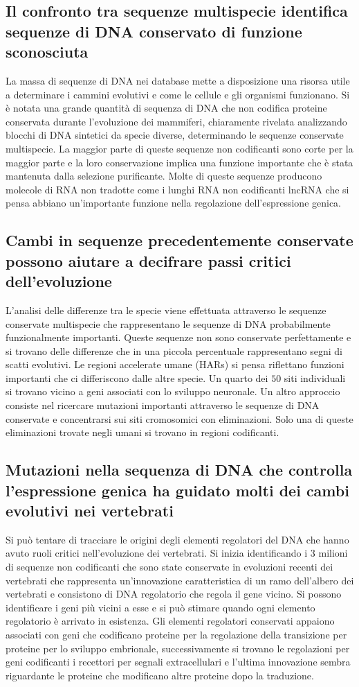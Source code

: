 \subsection{Il confronto tra sequenze multispecie identifica sequenze di DNA conservato di funzione sconosciuta}
La massa di sequenze di DNA nei database mette a disposizione una risorsa utile a determinare i cammini evolutivi e come le cellule e gli organismi funzionano. Si \`e notata una grande
quantit\`a di sequenza di DNA che non codifica proteine conservata durante l'evoluzione dei mammiferi, chiaramente rivelata analizzando blocchi di DNA sintetici da specie diverse, 
determinando le sequenze conservate multispecie. La maggior parte di queste sequenze non codificanti sono corte per la maggior parte e la loro conservazione implica una funzione 
importante che \`e stata mantenuta dalla selezione purificante. Molte di queste sequenze producono molecole di RNA non tradotte come i lunghi RNA non codificanti lncRNA che si pensa
abbiano un'importante funzione nella regolazione dell'espressione genica. 
\subsection{Cambi in sequenze precedentemente conservate possono aiutare a decifrare passi critici dell'evoluzione}
L'analisi delle differenze tra le specie viene effettuata attraverso le sequenze conservate multispecie che rappresentano le sequenze di DNA probabilmente funzionalmente importanti. 
Queste sequenze non sono conservate perfettamente e si trovano delle differenze che in una piccola percentuale rappresentano segni di scatti evolutivi. Le regioni accelerate umane
(HARs) si pensa riflettano funzioni importanti che ci differiscono dalle altre specie. Un quarto dei $50$ siti individuali si trovano vicino a geni associati con lo sviluppo neuronale. 
Un altro approccio consiste nel ricercare mutazioni importanti attraverso le sequenze di DNA conservate e concentrarsi sui siti cromosomici con eliminazioni. Solo una di queste 
eliminazioni trovate negli umani si trovano in regioni codificanti. 
\subsection{Mutazioni nella sequenza di DNA che controlla l'espressione genica ha guidato molti dei cambi evolutivi nei vertebrati}
Si pu\`o tentare di tracciare le origini degli elementi regolatori del DNA che hanno avuto ruoli critici nell'evoluzione dei vertebrati. Si inizia identificando i $3$ milioni di sequenze
non codificanti che sono state conservate in evoluzioni recenti dei vertebrati che rappresenta un'innovazione caratteristica di un ramo dell'albero dei vertebrati e consistono di DNA
regolatorio che regola il gene vicino. Si possono identificare i geni pi\`u vicini a esse e si pu\`o stimare quando ogni elemento regolatorio \`e arrivato in esistenza. Gli elementi 
regolatori conservati appaiono associati con geni che codificano proteine per la regolazione della transizione per proteine per lo sviluppo embrionale, successivamente si trovano le
regolazioni per geni codificanti i recettori per segnali extracellulari e l'ultima innovazione sembra riguardante le proteine che modificano altre proteine dopo la traduzione. 
